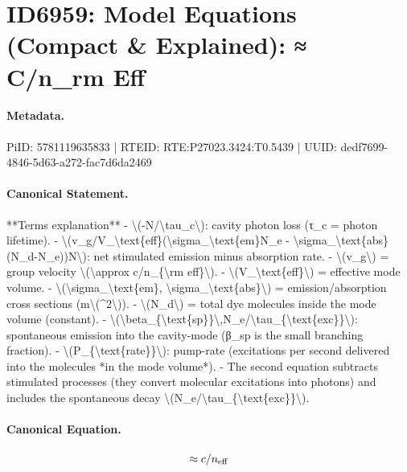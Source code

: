 \section*{ID6959: Model Equations (Compact \& Explained): ≈ C/n\_rm Eff}
\paragraph{Metadata.}
PiID: 5781119635833 | RTEID: RTE:P27023.3424:T0.5439 | UUID: dedf7699-4846-5d63-a272-fac7d6da2469

\paragraph{Canonical Statement.}
**Terms explanation** - \textbackslash{}(-N/\textbackslash{}tau\_c\textbackslash{}): cavity photon loss (τ\_c = photon lifetime). - \textbackslash{}(v\_g/V\_\textbackslash{}text\{eff\}(\textbackslash{}sigma\_\textbackslash{}text\{em\}N\_e - \textbackslash{}sigma\_\textbackslash{}text\{abs\}(N\_d-N\_e))N\textbackslash{}): net stimulated emission minus absorption rate. - \textbackslash{}(v\_g\textbackslash{}) = group velocity \textbackslash{}(\textbackslash{}approx c/n\_\{\textbackslash{}rm eff\}\textbackslash{}). - \textbackslash{}(V\_\textbackslash{}text\{eff\}\textbackslash{}) = effective mode volume. - \textbackslash{}(\textbackslash{}sigma\_\textbackslash{}text\{em\}, \textbackslash{}sigma\_\textbackslash{}text\{abs\}\textbackslash{}) = emission/absorption cross sections (m\textbackslash{}(\textasciicircum{}2\textbackslash{})). - \textbackslash{}(N\_d\textbackslash{}) = total dye molecules inside the mode volume (constant). - \textbackslash{}(\textbackslash{}beta\_\{\textbackslash{}text\{sp\}\}\textbackslash{},N\_e/\textbackslash{}tau\_\{\textbackslash{}text\{exc\}\}\textbackslash{}): spontaneous emission into the cavity-mode (β\_sp is the small branching fraction). - \textbackslash{}(P\_\{\textbackslash{}text\{rate\}\}\textbackslash{}): pump-rate (excitations per second delivered into the molecules *in the mode volume*). - The second equation subtracts stimulated processes (they convert molecular excitations into photons) and includes the spontaneous decay \textbackslash{}(N\_e/\textbackslash{}tau\_\{\textbackslash{}text\{exc\}\}\textbackslash{}).

\paragraph{Canonical Equation.}
\[
\approx c/n_{\rm eff}
\]

